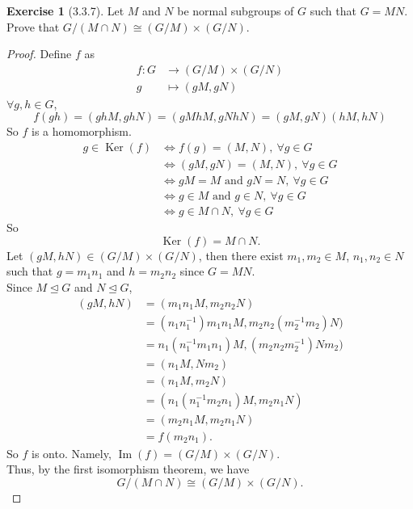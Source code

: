 \documentclass[14pt]{amsart}
\renewcommand{\ker}{\operatorname{Ker}}
\newcommand{\im}{\operatorname{Im}}
\theoremstyle{plain}
\theoremstyle{definition}
\newtheorem{exer}[lem]{Exercise}
\begin{document}
\begin{exer}[3.3.7]
Let $M$ and $N$ be normal subgroups of $G$ such that $G=MN$. Prove that $G/(M\cap N)\cong (G/M)\times(G/N)$. 
\begin{proof}
	Define $f$ as 
	\begin{align*}
	  f: G &\to (G/M) \times (G/N) \\
	  			g &\mapsto (gM, gN)
	\end{align*}
	$\forall g,h \in G$, 
	\[ f(gh) = (ghM, ghN) = (gMhM, gNhN) = (gM,gN)(hM, hN) \]
	So $f$ is a homomorphism.\\
	\begin{align*}
		g \in \ker(f) &\Leftrightarrow f(g) = (M,N),~\forall g \in G \\
	  	&\Leftrightarrow  (gM, gN) = (M,N), ~\forall g \in G\\
	  &\Leftrightarrow gM = M \text{ and } gN = N,~\forall g \in G\\
	  &\Leftrightarrow g \in M \text{ and } g\in N,~\forall g \in G\\
	  &\Leftrightarrow g \in M\cap N,~\forall g \in G
  	\end{align*}
  	So 
  	\[\ker(f) = M \cap N.\]
  	Let $(gM,hN) \in (G/M) \times (G/N)$, then there exist $m_1,m_2 \in M$, $n_1,n_2 \in N$ such that $g= m_1n_1$ and $h=m_2n_2$ since $G = MN$.\\
	Since $M \unlhd G$ and $N \unlhd G$,
	\begin{align*}
	  (gM,hN) & = (m_1n_1M,m_2n_2N)\\
	  		 	  	 &=(n_1n_1^{-1})m_1n_1M, m_2n_2(m_2^{-1}m_2)N) \\
	  			 	   &=n_1(n_1^{-1}m_1n_1)M, (m_2n_2m_2^{-1})Nm_2)\\
	  			 	  &=(n_1M, Nm_2)\\
	  				&=(n_1M, m_2N)\\
	  				&= (n_1(n_1^{-1}m_2n_1)M, m_2n_1N) \\
	  				&=(m_2n_1M,m_2n_1N)\\
	  				&=f(m_2n_1).
	\end{align*}
	So $f$ is onto. Namely, $\im(f) = (G/M) \times (G/N)$.\\
	Thus, by the first isomorphism theorem, we have
	\[ G/(M\cap N)\cong (G/M)\times(G/N). \]
\end{proof}
\end{exer}
\end{document}
